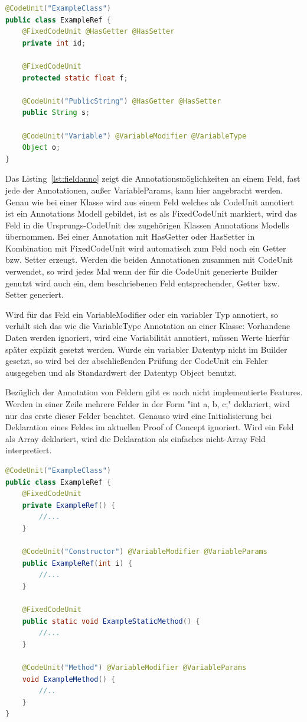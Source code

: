\documentclass[12pt,oneside,a4paper,parskip]{scrbook}
\begin{document}
\begin{lstlisting}[label=lst:fieldanno,
language=java,
firstnumber=1,
caption=Darstellung der Annotationsmöglichkeiten an einer Klasse.]
@CodeUnit("ExampleClass")
public class ExampleRef {
	@FixedCodeUnit @HasGetter @HasSetter
	private int id;

	@FixedCodeUnit
	protected static float f;

	@CodeUnit("PublicString") @HasGetter @HasSetter
	public String s;

	@CodeUnit("Variable") @VariableModifier @VariableType
	Object o;
}
\end{lstlisting}

Das Listing~\ref{lst:fieldanno} zeigt die Annotationsmöglichkeiten an einem Feld, fast jede der Annotationen, außer VariableParams, kann hier angebracht werden. Genau wie bei einer Klasse wird aus einem Feld welches als CodeUnit annotiert ist ein Annotations Modell gebildet, ist es als FixedCodeUnit markiert, wird das Feld in die Ursprungs-CodeUnit des zugehörigen Klassen Annotations Modells übernommen. Bei einer Annotation mit HasGetter oder HasSetter in Kombination mit FixedCodeUnit wird automatisch zum Feld noch ein Getter bzw. Setter erzeugt. Werden die beiden Annotationen zusammen mit CodeUnit verwendet, so wird jedes Mal wenn der für die CodeUnit generierte Builder genutzt wird auch ein, dem beschriebenen Feld entsprechender, Getter bzw. Setter generiert. 

Wird für das Feld ein VariableModifier oder ein variabler Typ annotiert, so verhält sich das wie die VariableType Annotation an einer Klasse: Vorhandene Daten werden ignoriert, wird eine Variabilität annotiert, müssen Werte hierfür später explizit gesetzt werden. Wurde ein variabler Datentyp nicht im Builder gesetzt, so wird bei der abschließenden Prüfung der CodeUnit ein Fehler ausgegeben und als Standardwert der Datentyp Object benutzt.

Bezüglich der Annotation von Feldern gibt es noch nicht implementierte Features. Werden in einer Zeile mehrere Felder in der Form "int a, b, c;" deklariert, wird nur das erste dieser Felder beachtet. Genauso wird eine Initialisierung bei Deklaration eines Feldes im aktuellen Proof of Concept ignoriert. Wird ein Feld als Array deklariert, wird die Deklaration als einfaches nicht-Array Feld interpretiert.

\begin{lstlisting}[label=lst:constrmethoanno,
language=java,
firstnumber=1,
caption=Darstellung der Annotationsmöglichkeiten von Konstruktoren und Methoden.]
@CodeUnit("ExampleClass")
public class ExampleRef {
	@FixedCodeUnit
	private ExampleRef() {
		//...
	}
	
	@CodeUnit("Constructor") @VariableModifier @VariableParams
	public ExampleRef(int i) {
		//...
	}
	
	@FixedCodeUnit
	public static void ExampleStaticMethod() {
		//...
	}
	
	@CodeUnit("Method") @VariableModifier @VariableParams
	void ExampleMethod() {
		//..
	}
}
\end{lstlisting}
\end{document}
